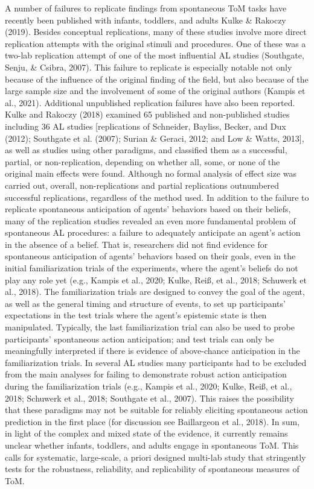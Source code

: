 \documentclass[
  english,
  man,floatsintext]{apa6}
\begin{document}
A number of failures to replicate findings from spontaneous ToM tasks have recently been published with infants, toddlers, and adults Kulke \& Rakoczy (2019). Besides conceptual replications, many of these studies involve more direct replication attempts with the original stimuli and procedures. One of these was a two-lab replication attempt of one of the most influential AL studies (Southgate, Senju, \& Csibra, 2007). This failure to replicate is especially notable not only because of the influence of the original finding of the field, but also because of the large sample size and the involvement of some of the original authors (Kampis et al., 2021). Additional unpublished replication failures have also been reported. Kulke and Rakoczy (2018) examined 65 published and non-published studies including 36 AL studies {[}replications of Schneider, Bayliss, Becker, and Dux (2012); Southgate et al. (2007); Surian \& Geraci, 2012; and Low \& Watts, 2013{]}, as well as studies using other paradigms, and classified them as a successful, partial, or non-replication, depending on whether all, some, or none of the original main effects were found. Although no formal analysis of effect size was carried out, overall, non-replications and partial replications outnumbered successful replications, regardless of the method used.
In addition to the failure to replicate spontaneous anticipation of agents' behaviors based on their beliefs, many of the replication studies revealed an even more fundamental problem of spontaneous AL procedures: a failure to adequately anticipate an agent's action in the absence of a belief. That is, researchers did not find evidence for spontaneous anticipation of agents' behaviors based on their goals, even in the initial familiarization trials of the experiments, where the agent's beliefs do not play any role yet (e.g., Kampis et al., 2020; Kulke, Reiß, et al., 2018; Schuwerk et al., 2018). The familiarization trials are designed to convey the goal of the agent, as well as the general timing and structure of events, to set up participants' expectations in the test trials where the agent's epistemic state is then manipulated. Typically, the last familiarization trial can also be used to probe participants' spontaneous action anticipation; and test trials can only be meaningfully interpreted if there is evidence of above-chance anticipation in the familiarization trials. In several AL studies many participants had to be excluded from the main analyses for failing to demonstrate robust action anticipation during the familiarization trials (e.g., Kampis et al., 2020; Kulke, Reiß, et al., 2018; Schuwerk et al., 2018; Southgate et al., 2007). This raises the possibility that these paradigms may not be suitable for reliably eliciting spontaneous action prediction in the first place (for discussion see Baillargeon et al., 2018).
In sum, in light of the complex and mixed state of the evidence, it currently remains unclear whether infants, toddlers, and adults engage in spontaneous ToM. This calls for systematic, large-scale, a priori designed multi-lab study that stringently tests for the robustness, reliability, and replicability of spontaneous measures of ToM.
\end{document}
